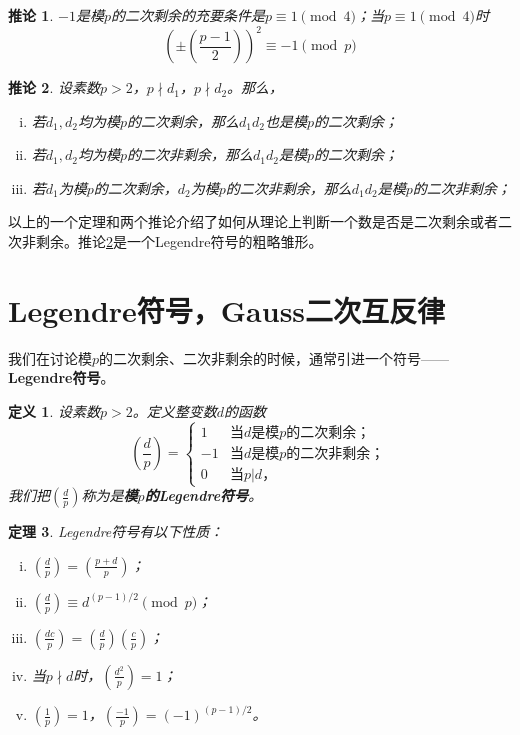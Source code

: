 \documentclass{ctexrep}
\newcommand{\bbold}[1]{\textbf{#1}}
\newtheorem{thrm}{定理}[section]
\newtheorem{defn}{定义}[section]
\newtheorem{coro}[thrm]{推论}
\begin{document}
\begin{coro}
$-1$是模$p$的二次剩余的充要条件是$p\equiv 1\pmod{4}$；当$p\equiv 1\pmod{4}$时
\begin{equation}
\left(\pm\left(\frac{p-1}{2}\right)\right)^2\equiv -1\pmod{p}
\end{equation}
\end{coro}

\begin{coro}\label{coro:euler_coro}
设素数$p>2$，$p\nmid d_1$，$p\nmid d_2$。那么，
\begin{enumerate}[(i)]
\item 若$d_1,d_2$均为模$p$的二次剩余，那么$d_1d_2$也是模$p$的二次剩余；
\item 若$d_1,d_2$均为模$p$的二次非剩余，那么$d_1d_2$是模$p$的二次剩余；
\item 若$d_1$为模$p$的二次剩余，$d_2$为模$p$的二次非剩余，那么$d_1d_2$是模$p$的二次非剩余；
\end{enumerate}
\end{coro}

以上的一个定理和两个推论介绍了如何从理论上判断一个数是否是二次剩余或者二次非剩余。推论\ref{coro:euler_coro}是一个Legendre符号的粗略雏形。

\section{Legendre符号，Gauss二次互反律}
我们在讨论模$p$的二次剩余、二次非剩余的时候，通常引进一个符号——\bbold{Legendre符号}。

\begin{defn}
设素数$p>2$。定义整变数$d$的函数
\begin{displaymath}
\left( \frac{d}{p} \right) =
  \begin{cases}
  1 & \text{当$d$是模$p$的二次剩余；}\\
  -1 & \text{当$d$是模$p$的二次非剩余；}\\
  0 & \text{当$p|d$，}
  \end{cases}
\end{displaymath}
我们把$(\frac{d}{p})$称为是\bbold{模$p$的Legendre符号}。
\end{defn}

\begin{thrm}
Legendre符号有以下性质：
\begin{enumerate}[(i)]
\item $\left(\frac{d}{p}\right)=\left(\frac{p+d}{p}\right)$；
\item $\left(\frac{d}{p}\right)\equiv d^{(p-1)/2}\pmod{p}$；
\item $\left(\frac{dc}{p}\right)=\left(\frac{d}{p}\right)\left(\frac{c}{p}\right)$；
\item 当$p\nmid d$时，$\left(\frac{d^2}{p}\right)=1$；
\item $\left(\frac{1}{p}\right)=1$，$\left(\frac{-1}{p}\right)=(-1)^{(p-1)/2}$。
\end{enumerate}
\end{thrm}
\end{document}
